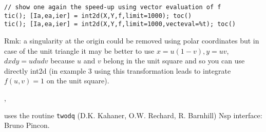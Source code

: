 \begin{examples}
\begin{Verbatim}
// show one again the speed-up using vector evaluation of f
tic(); [Ia,ea,ier] = int2d(X,Y,f,limit=1000); toc()
tic(); [Ia,ea,ier] = int2d(X,Y,f,limit=1000,vecteval=%t); toc()
\end{Verbatim}
Rmk: a singularity at the origin could be removed using polar
coordinates but in case of the unit triangle it may be better
to use $x = u(1-v), y = uv$, $dxdy = u dudv$ because $u$ and $v$
belong in the unit square and so you can use directly int2d
(in example 3 using this transformation leads to integrate $f(u,v)=1$
on the unit square). 
\end{examples}

\begin{manseealso}
  ,   
\end{manseealso}

\begin{authors}
  uses the routine \verb!twodq! (D.K. Kahaner, O.W. Rechard, R. Barnhill)
  Nsp interface: Bruno Pincon.
\end{authors}
